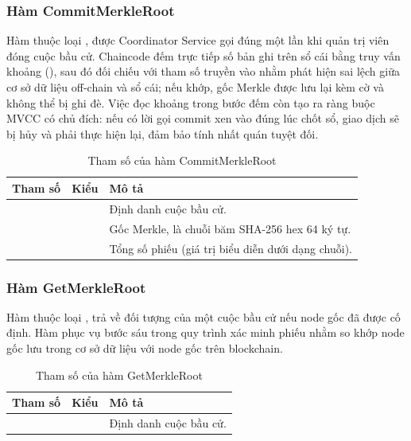 \subsubsection{Hàm CommitMerkleRoot}

Hàm  thuộc loại , được Coordinator Service gọi đúng một lần khi quản trị viên đóng cuộc bầu cử. Chaincode đếm trực tiếp số bản ghi  trên sổ cái bằng truy vấn khoảng (), sau đó đối chiếu với tham số  truyền vào nhằm phát hiện sai lệch giữa cơ sở dữ liệu off-chain và sổ cái; nếu khớp, gốc Merkle được lưu lại kèm cờ  và không thể bị ghi đè. Việc đọc khoảng trong bước đếm còn tạo ra ràng buộc MVCC có chủ đích: nếu có lời gọi  commit xen vào đúng lúc chốt sổ, giao dịch  sẽ bị hủy và phải thực hiện lại, đảm bảo tính nhất quán tuyệt đối.

\begin{table}[H]
    \centering
    \small
    \setlength{\tabcolsep}{3pt}
    \caption{Tham số của hàm CommitMerkleRoot}
    \label{tab:cc-commitmerkleroot}
    \begin{tabularx}{\textwidth}{|L{0.25}|L{0.25}|L{0.50}|}
    \hline
    \textbf{Tham số} & \textbf{Kiểu} & \textbf{Mô tả} \\
    \hline
       &  & Định danh cuộc bầu cử. \\ \hline
       &  & Gốc Merkle, là chuỗi băm SHA-256 hex 64 ký tự. \\ \hline
     &  & Tổng số phiếu (giá trị  biểu diễn dưới dạng chuỗi). \\ \hline
    \end{tabularx}
\end{table}

\subsubsection{Hàm GetMerkleRoot}

Hàm  thuộc loại , trả về đối tượng  của một cuộc bầu cử nếu node gốc đã được cố định. Hàm phục vụ bước sáu trong quy trình xác minh phiếu nhằm so khớp node gốc lưu trong cơ sở dữ liệu với node gốc trên blockchain.

\begin{table}[H]
    \centering
    \small
    \setlength{\tabcolsep}{3pt}
    \caption{Tham số của hàm GetMerkleRoot}
    \label{tab:cc-getmerkleroot}
    \begin{tabularx}{\textwidth}{|L{0.25}|L{0.25}|L{0.50}|}
    \hline
    \textbf{Tham số} & \textbf{Kiểu} & \textbf{Mô tả} \\
    \hline
     &  & Định danh cuộc bầu cử. \\ \hline
    \end{tabularx}
\end{table}

